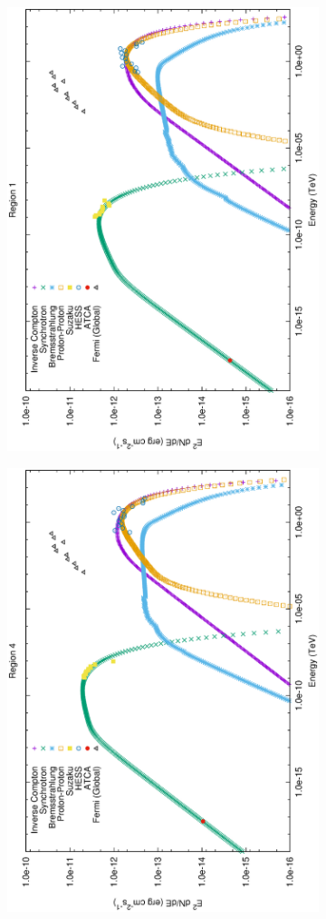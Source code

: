 \documentclass[12pt,a4paper]{article}
\begin{document}
\begin{figure}[H]
	\begin{subfigure}{0.5\textwidth}
		\centering
		\includegraphics[width=0.7\linewidth, height=0.27\textheight, angle=-90]{rxj1713_lephad1}
		\label{fig:rxj1713lephad1}
	\end{subfigure}
	\begin{subfigure}{0.5\textwidth}
		\centering
		\includegraphics[width=0.7\linewidth, height=0.27\textheight, angle=-90]{rxj1713_lephad4}

\end{subfigure}
\end{figure}
\end{document}
